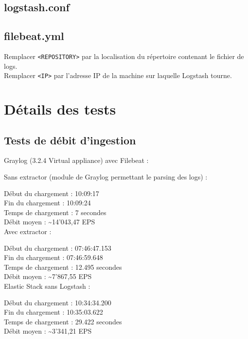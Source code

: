 \documentclass[paper=a4, fontsize=11pt]{scrartcl}
\begin{document}
\subsection{logstash.conf}
\label{appendix:logstashConf}


\subsection{filebeat.yml}
\label{appendix:filebeatConf}

Remplacer \verb,<REPOSITORY>, par la localisation du répertoire contenant le fichier de logs.\\
Remplacer \verb,<IP>, par l'adresse IP de la machine sur laquelle Logstash tourne.


\newpage



\section{Détails des tests}

\subsection{Tests de débit d'ingestion}

Graylog (3.2.4 Virtual appliance) avec Filebeat :

Sans extractor (module de Graylog permettant le parsing des logs) :

Début du chargement : 10:09:17 \\
Fin du chargement : 10:09:24 \\
Temps de chargement : 7 secondes \\
Débit moyen : \textasciitilde 14'043,47 EPS \\

Avec extractor :

Début du chargement : 07:46:47.153 \\
Fin du chargement : 07:46:59.648 \\
Temps de chargement : 12.495 secondes \\
Débit moyen : \textasciitilde 7'867,55 EPS \\

Elastic Stack sans Logstash :

Début du chargement : 10:34:34.200 \\
Fin du chargement : 10:35:03.622 \\
Temps de chargement : 29.422 secondes \\
Débit moyen : \textasciitilde 3'341,21 EPS \\
\end{document}
